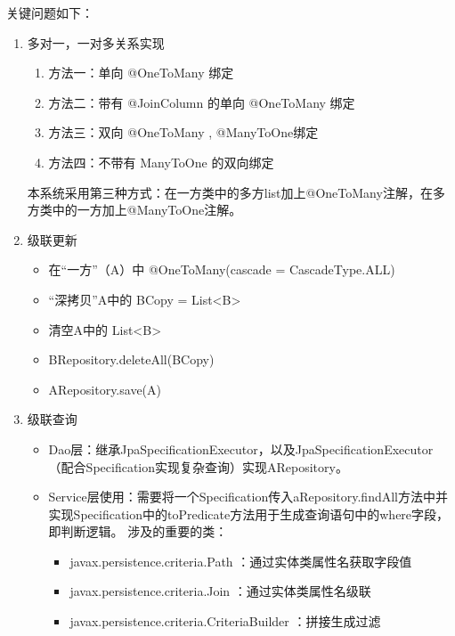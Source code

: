 关键问题如下：

\begin{enumerate}
  \item 多对一，一对多关系实现
        \begin{enumerate}
          \item 方法一：单向 @OneToMany 绑定
          \item 方法二：带有 @JoinColumn 的单向 @OneToMany 绑定
          \item 方法三：双向 @OneToMany , @ManyToOne绑定
          \item 方法四：不带有 ManyToOne 的双向绑定
        \end{enumerate}
        本系统采用第三种方式：在一方类中的多方list加上@OneToMany注解，在多方类中的一方加上@ManyToOne注解。
  \item   级联更新
        \begin{itemize}
          \item 在“一方”（A）中  @OneToMany(cascade = CascadeType.ALL)
          \item “深拷贝”A中的  BCopy = List<B>
          \item 清空A中的  List<B>
          \item  BRepository.deleteAll(BCopy)
          \item  ARepository.save(A)
        \end{itemize}
  \item   级联查询
        \begin{itemize}
          \item Dao层：继承JpaSpecificationExecutor，以及JpaSpecificationExecutor（配合Specification实现复杂查询）实现ARepository。
          \item Service层使用：需要将一个Specification传入aRepository.findAll方法中并实现Specification中的toPredicate方法用于生成查询语句中的where字段，即判断逻辑。
                涉及的重要的类：
                \begin{itemize}
                  \item  javax.persistence.criteria.Path ：通过实体类属性名获取字段值
                  \item  javax.persistence.criteria.Join ：通过实体类属性名级联
                  \item  javax.persistence.criteria.CriteriaBuilder ：拼接生成过滤
                \end{itemize}
        \end{itemize}
\end{enumerate}

